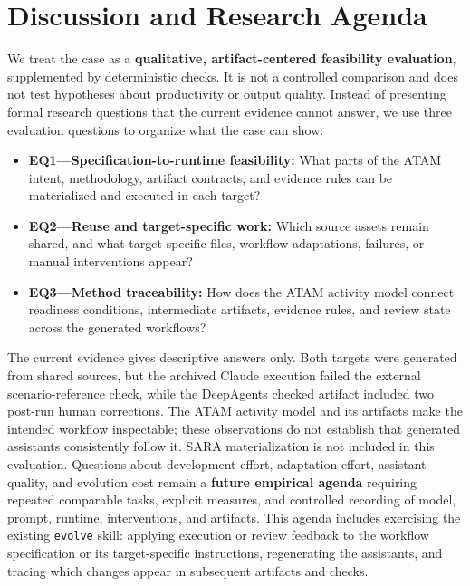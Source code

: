 \documentclass[10pt,conference]{IEEEtran}
\begin{document}
\section{Discussion and Research Agenda}

We treat the case as a \textbf{qualitative, artifact-centered feasibility evaluation}, supplemented by deterministic checks. It is not a controlled comparison and does not test hypotheses about productivity or output quality. Instead of presenting formal research questions that the current evidence cannot answer, we use three evaluation questions to organize what the case can show:

\begin{itemize}

\item
  \textbf{EQ1---Specification-to-runtime feasibility:} What parts of the ATAM intent, methodology, artifact contracts, and evidence rules can be materialized and executed in each target?
\item
  \textbf{EQ2---Reuse and target-specific work:} Which source assets remain shared, and what target-specific files, workflow adaptations, failures, or manual interventions appear?
\item
  \textbf{EQ3---Method traceability:} How does the ATAM activity model connect readiness conditions, intermediate artifacts, evidence rules, and review state across the generated workflows?
\end{itemize}

The current evidence gives descriptive answers only. Both targets were generated from shared sources, but the archived Claude execution failed the external scenario-reference check, while the DeepAgents checked artifact included two post-run human corrections. The ATAM activity model and its artifacts make the intended workflow inspectable; these observations do not establish that generated assistants consistently follow it. SARA materialization is not included in this evaluation. Questions about development effort, adaptation effort, assistant quality, and evolution cost remain a \textbf{future empirical agenda} requiring repeated comparable tasks, explicit measures, and controlled recording of model, prompt, runtime, interventions, and artifacts. This agenda includes exercising the existing \texttt{evolve} skill: applying execution or review feedback to the workflow specification or its target-specific instructions, regenerating the assistants, and tracing which changes appear in subsequent artifacts and checks.
\end{document}
